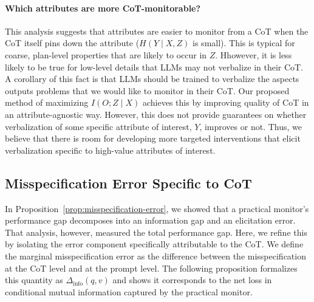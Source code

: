\documentclass{article}
\theoremstyle{plain}
\begin{document}
\paragraph{Which attributes are more CoT-monitorable?}
This analysis suggests that attributes are easier to monitor from a CoT when the CoT itself pins down the attribute ($H(Y\mid X,Z)$ is small).
This is typical for coarse, plan-level properties that are likely to occur in $Z$. Hhowever, it is less likely to be true for low-level details that LLMs may not verbalize in their CoT.
A corollary of this fact is that LLMs should be trained to verbalize the aspects outputs problems that we would like to monitor in their CoT.
Our proposed method of maximizing $I(O;Z \mid X)$ achieves this by improving quality of CoT in an attribute-agnostic way. However, this does not provide guarantees on whether verbalization of some specific attribute of interest, $Y$, improves or not.
Thus, we believe that there is room for developing more targeted interventions that elicit verbalization specific to high-value attributes of interest.

\subsection{Misspecification Error Specific to CoT}
In Proposition~\ref{prop:misspecification-error}, we showed that a practical monitor's performance gap decomposes into an information gap and an elicitation error. That analysis, however, measured the total performance gap. Here, we refine this by isolating the error component specifically attributable to the CoT. We define the marginal misspecification error as the difference between the misspecification at the CoT level and at the prompt level. The following proposition formalizes this quantity as \(\Delta_{\mathrm{info}}(q,v)\) and shows it corresponds to the net loss in conditional mutual information captured by the practical monitor.
\end{document}
